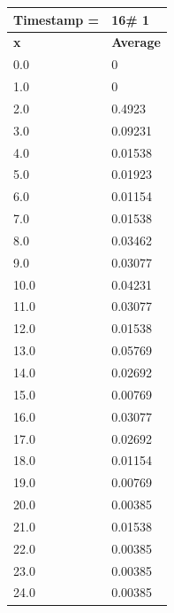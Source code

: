 \begin{tabular}{|l||l|}
\hline
\textbf{Timestamp =} & \textbf{16}\# 1\\\hline
	\textbf{x} & \textbf{Average} \\ \hline
\hline
	0.0 & 0 \\ \hline
	1.0 & 0 \\ \hline
	2.0 & 0.4923 \\ \hline
	3.0 & 0.09231 \\ \hline
	4.0 & 0.01538 \\ \hline
	5.0 & 0.01923 \\ \hline
	6.0 & 0.01154 \\ \hline
	7.0 & 0.01538 \\ \hline
	8.0 & 0.03462 \\ \hline
	9.0 & 0.03077 \\ \hline
	10.0 & 0.04231 \\ \hline
	11.0 & 0.03077 \\ \hline
	12.0 & 0.01538 \\ \hline
	13.0 & 0.05769 \\ \hline
	14.0 & 0.02692 \\ \hline
	15.0 & 0.00769 \\ \hline
	16.0 & 0.03077 \\ \hline
	17.0 & 0.02692 \\ \hline
	18.0 & 0.01154 \\ \hline
	19.0 & 0.00769 \\ \hline
	20.0 & 0.00385 \\ \hline
	21.0 & 0.01538 \\ \hline
	22.0 & 0.00385 \\ \hline
	23.0 & 0.00385 \\ \hline
	24.0 & 0.00385 \\ \hline
\end{tabular}
